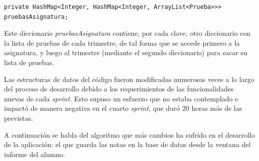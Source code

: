 \begin{lstlisting}
private HashMap<Integer, HashMap<Integer, ArrayList<Prueba>>> pruebasAsignatura;
\end{lstlisting}

Este diccionario \textit{pruebasAsignatura} contiene, por cada clave, otro diccionario con la lista de pruebas de cada trimestre, de tal forma que se accede primero a la asignatura, y luego al trimestre (mediante el segundo diccionario) para sacar su lista de pruebas.

Las estructuras de datos del código fueron modificadas numerosas veces a lo largo del proceso de desarrollo debido a los requerimientos de las funcionalidades nuevas de cada \textit{sprint}. Esto supuso un esfuerzo que no estaba contemplado e impactó de manera negativa en el cuarto \textit{sprint}, que duró 20 horas más de las previstas.

A continuación se habla del algoritmo que más cambios ha sufrido en el desarrollo de la aplicación: el que guarda las notas en la base de datos desde la ventana del informe del alumno.

